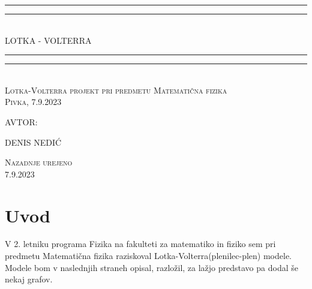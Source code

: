 \documentclass[11pt]{report}
\newlength{\drop}
\begin{document}
	\begin{titlepage}
		\textheight
		\centering
		\vspace*{\baselineskip}
		\rule{\textwidth}{1.6pt}\vspace*{-\baselineskip}\vspace*{2pt}
		\rule{\textwidth}{0.4pt}\\[\baselineskip]
		{\LARGE LOTKA - VOLTERRA}\\[0.2\baselineskip]
		\rule{\textwidth}{0.4pt}\vspace*{-\baselineskip}\vspace{3.2pt}
		\rule{\textwidth}{1.6pt}\\[\baselineskip]
		\scshape
		Lotka-Volterra projekt pri predmetu Matematična fizika\\
		\vspace{5mm}
		Pivka, 7.9.2023\par
		\vspace{20mm}
		AVTOR:
		\vspace*{2\baselineskip}
		\\[\baselineskip]
		{\Large DENIS NEDIĆ\par}
		
		\vfill
		{\scshape Nazadnje urejeno} \\
		{\large 7.9.2023}\par
	\end{titlepage}
\tableofcontents
	\section{Uvod}
	V 2. letniku programa Fizika na fakulteti za matematiko in fiziko sem pri predmetu Matematična fizika raziskoval Lotka-Volterra(plenilec-plen) modele. Modele bom v naslednjih straneh opisal, razložil, za lažjo predstavo pa dodal še nekaj grafov.
\end{document}

